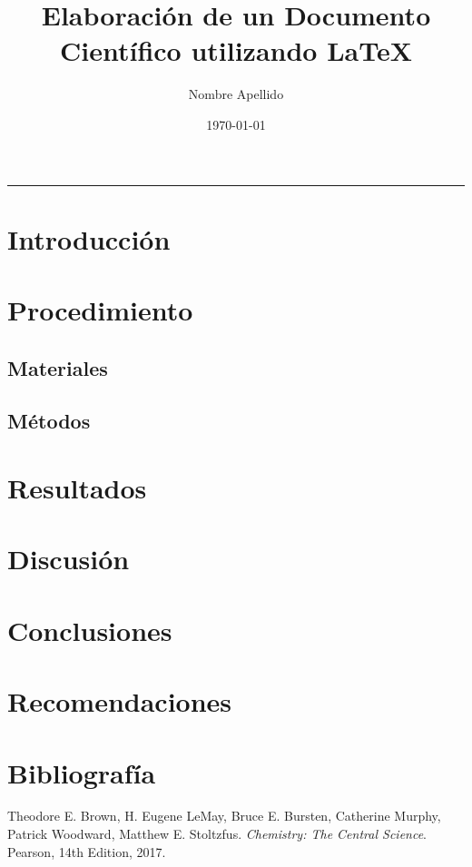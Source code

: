 \documentclass{article}
\title{Elaboración de un Documento Científico utilizando \LaTeX}
\author{Nombre Apellido}
\date{\today}
\begin{document}
\maketitle

\begin{adjustwidth}{1cm}{1cm}
\lipsum[1]\cite{genchem}%
\end{adjustwidth}
\rule{\textwidth}{0.4pt}
\vspace*{5mm}

\begin{multicols*}{2}
\section{Introducción}
\lipsum[2]\cite{ochem}%
\section{Procedimiento}
\lipsum[3]\cite{pchem}%
\subsection{Materiales}
\lipsum[4]%
\subsection{Métodos}
\lipsum[5]%
\section{Resultados}
\lipsum[6]\cite{ichem}%
\section{Discusión}
\lipsum[7]\cite{biochem}%
\section{Conclusiones}
\lipsum[8]%
\section{Recomendaciones}
\lipsum[9]%
\section{Bibliografía}

\begin{thebibliography}{9}
Theodore E. Brown, H. Eugene LeMay, Bruce E. Bursten, Catherine Murphy, Patrick Woodward, Matthew E. Stoltzfus.
\textit{Chemistry: The Central Science}. 
Pearson, 14th Edition, 2017.


\end{thebibliography}
\end{multicols*}
\end{document}
